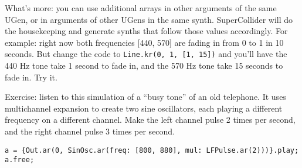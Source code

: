 What's more: you can use additional arrays in other arguments of the same UGen, or in arguments of other UGens in the same synth. SuperCollider will do the housekeeping and generate synths that follow those values accordingly. For example: right now both frequencies [440, 570] are fading in from 0 to 1 in 10 seconds. But change the code to \texttt{Line.kr(0, 1, [1, 15])} and you'll have the 440 Hz tone take 1 second to fade in, and the 570 Hz tone take 15 seconds to fade in. Try it.

Exercise: listen to this simulation of a ``busy tone'' of an old telephone. It uses multichannel expansion to create two sine oscillators, each playing a different frequency on a different channel. Make the left channel pulse 2 times per second, and the right channel pulse 3 times per second.

\medskip
\begin{lstlisting}[style=SuperCollider-IDE, basicstyle=\scttfamily\footnotesize]
a = {Out.ar(0, SinOsc.ar(freq: [800, 880], mul: LFPulse.ar(2)))}.play;
a.free;
\end{lstlisting}